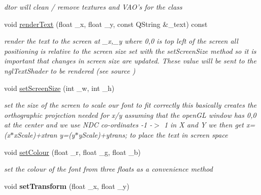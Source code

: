 \begin{DoxyCompactItemize}
\begin{DoxyCompactList}\small\item\em dtor will clean / remove textures and V\-A\-O's for the class \end{DoxyCompactList}\item 
void \hyperlink{class_text_a012d1b8a4a25f06e73091c232eb91fa4}{render\-Text} (float \-\_\-x, float \-\_\-y, const Q\-String \&\-\_\-text) const 
\begin{DoxyCompactList}\small\item\em render the text to the screen at \-\_\-x,\-\_\-y where 0,0 is top left of the screen all positioning is relative to the screen size set with the set\-Screen\-Size method so it is important that changes in screen size are updated. These value will be sent to the ngl\-Text\-Shader to be rendered (see source ) \end{DoxyCompactList}\item 
void \hyperlink{class_text_adf20a23bc781824e83dc50c121f56aea}{set\-Screen\-Size} (int \-\_\-w, int \-\_\-h)
\begin{DoxyCompactList}\small\item\em set the size of the screen to scale our font to fit correctly this basically creates the orthographic projection needed for x/y assuming that the open\-G\-L window has 0,0 at the center and we use N\-D\-C co-\/ordinates -\/1 -\/$>$ 1 in X and Y we then get x=(x$\ast$x\-Scale)+xtran y=(y$\ast$y\-Scale)+ytrans; to place the text in screen space \end{DoxyCompactList}\item 
void \hyperlink{class_text_a85589d9fc53821cb75dd963d41eafed0}{set\-Colour} (float \-\_\-r, float \-\_\-g, float \-\_\-b)
\begin{DoxyCompactList}\small\item\em set the colour of the font from three floats as a convenience method \end{DoxyCompactList}\item 
\hypertarget{class_text_a6ec9d77b284824829150b8ebb436c358}{void {\bfseries set\-Transform} (float \-\_\-x, float \-\_\-y)}\label{class_text_a6ec9d77b284824829150b8ebb436c358}

\end{DoxyCompactItemize}
